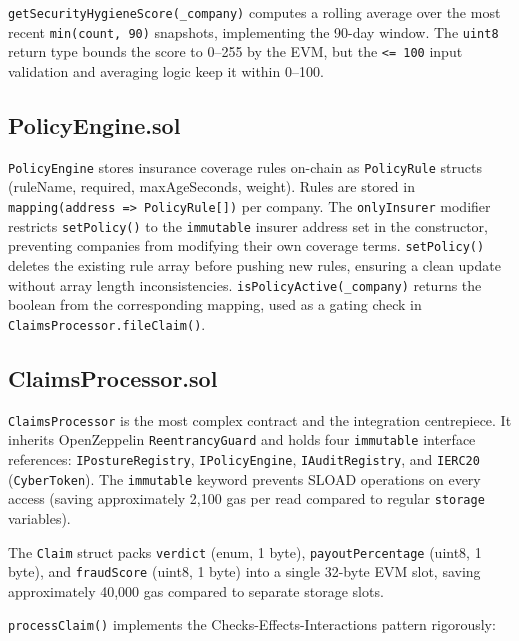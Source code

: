 \documentclass[12pt,a4paper]{article}
\begin{document}
\texttt{getSecurityHygieneScore(\_company)} computes a rolling average
over the most recent \texttt{min(count, 90)} snapshots, implementing
the 90-day window. The \texttt{uint8} return type bounds the score
to 0--255 by the EVM, but the \texttt{<= 100} input validation and
averaging logic keep it within 0--100.

\subsection{PolicyEngine.sol}
\label{sec:policy-engine}

\texttt{PolicyEngine} stores insurance coverage rules on-chain as
\texttt{PolicyRule} structs (ruleName, required, maxAgeSeconds, weight).
Rules are stored in \texttt{mapping(address => PolicyRule[])} per
company. The \texttt{onlyInsurer} modifier restricts \texttt{setPolicy()}
to the \texttt{immutable} insurer address set in the constructor,
preventing companies from modifying their own coverage terms.
\texttt{setPolicy()} deletes the existing rule array before pushing
new rules, ensuring a clean update without array length inconsistencies.
\texttt{isPolicyActive(\_company)} returns the boolean from the
corresponding mapping, used as a gating check in
\texttt{ClaimsProcessor.fileClaim()}.

\subsection{ClaimsProcessor.sol}
\label{sec:claims-processor}

\texttt{ClaimsProcessor} is the most complex contract and the
integration centrepiece. It inherits OpenZeppelin
\texttt{ReentrancyGuard} and holds four \texttt{immutable} interface
references: \texttt{IPostureRegistry}, \texttt{IPolicyEngine},
\texttt{IAuditRegistry}, and \texttt{IERC20} (\texttt{CyberToken}).
The \texttt{immutable} keyword prevents SLOAD operations on every
access (saving approximately 2,100 gas per read compared to regular
\texttt{storage} variables).

The \texttt{Claim} struct packs \texttt{verdict} (enum, 1 byte),
\texttt{payoutPercentage} (uint8, 1 byte), and \texttt{fraudScore}
(uint8, 1 byte) into a single 32-byte EVM slot, saving approximately
40,000 gas compared to separate storage slots.

\texttt{processClaim()} implements the Checks-Effects-Interactions
pattern rigorously:
\end{document}
